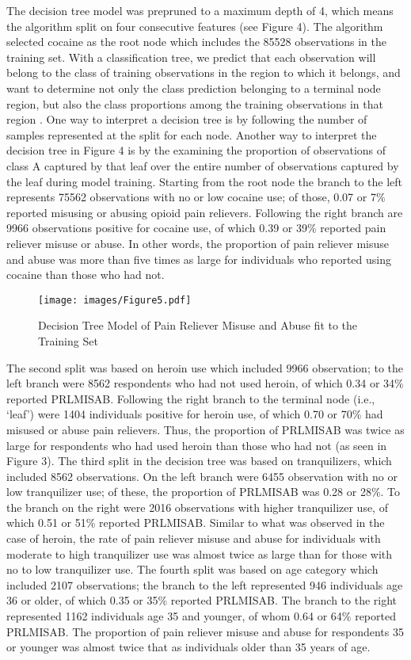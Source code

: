 \documentclass[sigconf]{acmart}
\begin{document}
The decision tree model was prepruned to a maximum depth of 4, which means 
the algorithm split on four consecutive features (see Figure 4). The  
algorithm selected cocaine as the root node which includes the 85528 
observations in the training set. With a classification tree, we predict 
that each observation will belong to the class of training observations in 
the region to which it belongs, and want to determine not only the class
prediction belonging to a terminal node region, but also the class 
proportions among the training observations in that region \cite{james13}. 
One way to interpret a decision tree is by following the number of samples 
represented at the split for each node. Another way to interpret the decision 
tree in Figure 4 is by the examining the proportion of observations of 
class A captured by that leaf over the entire number of observations captured 
by the leaf during model training. Starting from the root node the branch 
to the left represents 75562 observations with no or low cocaine use; 
of those, 0.07 or 7\% reported misusing or abusing opioid pain relievers. 
Following the right branch are 9966 observations positive for cocaine use, 
of which 0.39 or 39\% reported pain reliever misuse or abuse. In other words, 
the proportion of pain reliever misuse and abuse was more than five times as 
large for individuals who reported using cocaine than those who had not. 

\begin{figure}[!ht]
  \centering\texttt{[image: images/Figure5.pdf]}
  \caption{Decision Tree Model of Pain Reliever Misuse and Abuse
  fit to the Training Set}
  \label{f:Figure5}
\end{figure}

The second split was based on heroin use which included 9966 observation; 
to the left branch were 8562 respondents who had not used heroin, of which
0.34 or 34\% reported PRLMISAB. Following the right branch to the terminal 
node (i.e., `leaf') were 1404 individuals positive for heroin use, of which
0.70 or 70\% had misused or abuse pain relievers. Thus, the proportion of 
PRLMISAB was twice as large for respondents who had used heroin than those 
who had not (as seen in Figure 3). The third split in the decision tree was 
based on tranquilizers, which included 8562 observations. On the left branch 
were 6455 observation with no or low tranquilizer use; of these, the 
proportion of PRLMISAB was 0.28 or 28\%. To the branch on the right were 
2016 observations with higher tranquilizer use, of which 0.51 or 51\% 
reported PRLMISAB. Similar to what was observed in the case of heroin, the 
rate of pain reliever misuse and abuse for individuals with moderate to high
tranquilizer use was almost twice as large than for those with no to low
tranquilizer use. The fourth split was based on age category which included
2107 observations; the branch to the left represented 946 individuals age 
36 or older, of which 0.35 or 35\% reported PRLMISAB. The branch to the 
right represented 1162 individuals age 35 and younger, of whom 0.64 or 64\% 
reported PRLMISAB. The proportion of pain reliever misuse and abuse for
respondents 35 or younger was almost twice that as individuals older 
than 35 years of age. 
\end{document}
